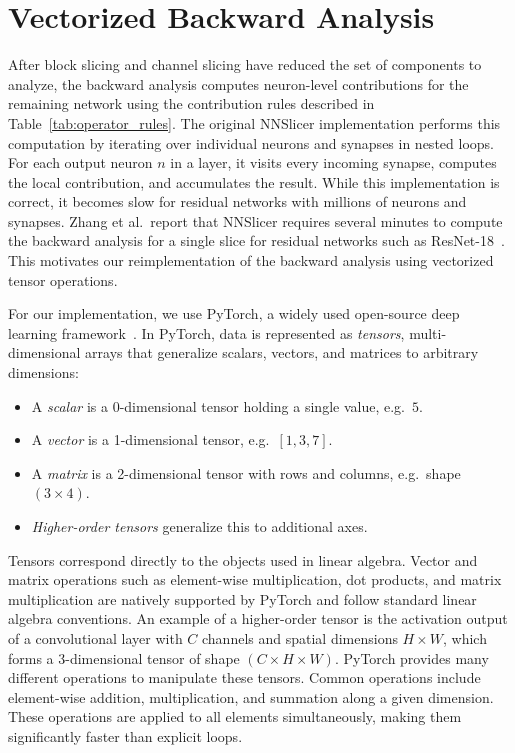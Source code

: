\documentclass[
12pt,
fancyheadings,
a4paper,
twoside,
BCOR=0.7cm,
nobcorignoretitle,
grayscalebody,
]{stsreprt}
\begin{document}
\section{Vectorized Backward Analysis}
\label{sec:vectorized_backward}

After block slicing and channel slicing have reduced the set of components to analyze,
the backward analysis computes neuron-level contributions for the remaining network using the
contribution rules described in Table~\ref{tab:operator_rules}.
The original NNSlicer implementation performs this computation by iterating over individual neurons
and synapses in nested loops.
For each output neuron $n$ in a layer, it visits every incoming synapse, computes the local
contribution, and accumulates the result.
While this implementation is correct, it becomes slow for residual networks with millions of
neurons and synapses.
Zhang et al.\ report that NNSlicer requires several minutes to compute the backward analysis for a
single slice for residual networks such as ResNet-18~\cite{zhang2020dynamic}.
This motivates our reimplementation of the backward analysis using vectorized tensor operations.


For our implementation, we use PyTorch, a widely used open-source deep learning
framework~\cite{paszke2019pytorch}.
In PyTorch, data is represented as \textit{tensors}, multi-dimensional arrays that generalize
scalars, vectors, and matrices to arbitrary dimensions:
\begin{itemize}
\item A \textit{scalar} is a 0-dimensional tensor holding a single value, e.g.\ $5$.
\item A \textit{vector} is a 1-dimensional tensor, e.g.\ $[1, 3, 7]$.
\item A \textit{matrix} is a 2-dimensional tensor with rows and columns, e.g.\ shape $(3 \times 4)$.
\item \textit{Higher-order tensors} generalize this to additional axes.
\end{itemize}
Tensors correspond directly to the objects used in linear algebra.
Vector and matrix operations such as element-wise multiplication, dot products, and matrix
multiplication are natively supported by PyTorch and follow standard linear algebra conventions.
An example of a higher-order tensor is the activation output of a convolutional layer with $C$
channels and spatial dimensions $H \times W$, which forms a 3-dimensional tensor of shape $(C
\times H \times W)$.
PyTorch provides many different operations to manipulate these tensors. Common operations include
element-wise addition, multiplication, and summation along a given dimension. These operations are
applied to all elements simultaneously, making them significantly faster than explicit loops.
\end{document}

